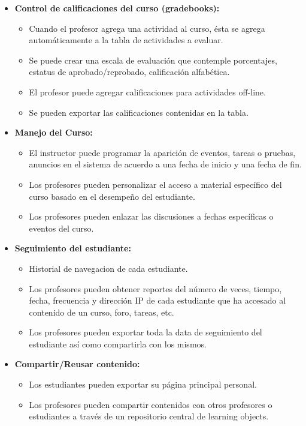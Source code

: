 	\begin{itemize}
		\item \textbf{Control de calificaciones del curso (gradebooks):}
			\begin{itemize}
				\item Cuando el profesor agrega una actividad al curso, ésta se agrega automáticamente a la tabla de actividades a evaluar.
				\item Se puede crear una escala de evaluación que contemple porcentajes, estatus de aprobado/reprobado, calificación alfabética.
				\item El profesor puede agregar calificaciones para actividades off-line.
				\item Se pueden exportar las calificaciones contenidas en la tabla.
			\end{itemize}
	\end{itemize}
	\begin{itemize}
		\item \textbf{Manejo del Curso:}
			\begin{itemize}
				\item El instructor puede programar la aparición de eventos, tareas o pruebas, anuncios en el sistema de acuerdo a una fecha de inicio y una fecha de fin.
				\item Los profesores pueden personalizar el acceso a material específico del curso basado en el desempeño del estudiante.
				\item Los profesores pueden enlazar las discusiones a fechas específicas o eventos del curso.
			\end{itemize}
	\end{itemize}
	\begin{itemize}
		\item \textbf{Seguimiento del estudiante:}
			\begin{itemize}
				\item Historial de navegacion de cada estudiante.
				\item Los profesores pueden obtener reportes del número de veces, tiempo, fecha, frecuencia y dirección IP de cada estudiante que ha accesado al contenido de un curso, foro, tareas, etc.
				\item Los profesores pueden exportar toda la data de  seguimiento del estudiante así como compartirla con los mismos.
			\end{itemize}
	\end{itemize}
	\begin{itemize}
		\item \textbf{Compartir/Reusar contenido:}
			\begin{itemize}		
				\item Los estudiantes pueden exportar su página principal personal.
				\item Los profesores pueden compartir contenidos con otros profesores o estudiantes a través de un repositorio central de learning objects.
			\end{itemize}
	\end{itemize}
